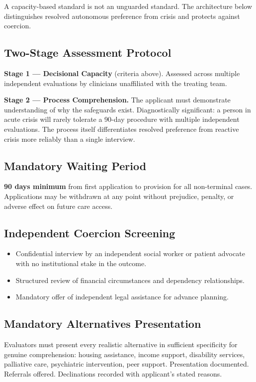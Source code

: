 \documentclass[11pt, letterpaper]{article}
\begin{document}
A capacity-based standard is not an unguarded standard. The architecture below
distinguishes resolved autonomous preference from crisis and protects against coercion.

\subsection{Two-Stage Assessment Protocol}

\textbf{Stage 1 --- Decisional Capacity} (criteria above). Assessed across multiple
independent evaluations by clinicians unaffiliated with the treating team.

\textbf{Stage 2 --- Process Comprehension.} The applicant must demonstrate understanding of
why the safeguards exist. Diagnostically significant: a person in acute crisis will rarely
tolerate a 90-day procedure with multiple independent evaluations. The process itself
differentiates resolved preference from reactive crisis more reliably than a single interview.

\subsection{Mandatory Waiting Period}

\textbf{90 days minimum} from first application to provision for all non-terminal cases.
Applications may be withdrawn at any point without prejudice, penalty, or adverse effect
on future care access.

\subsection{Independent Coercion Screening}

\begin{itemize}
  \item Confidential interview by an independent social worker or patient advocate
    with no institutional stake in the outcome.
  \item Structured review of financial circumstances and dependency relationships.
  \item Mandatory offer of independent legal assistance for advance planning.
\end{itemize}

\subsection{Mandatory Alternatives Presentation}

Evaluators must present every realistic alternative in sufficient specificity for genuine
comprehension: housing assistance, income support, disability services, palliative care,
psychiatric intervention, peer support. Presentation documented. Referrals offered.
Declinations recorded with applicant's stated reasons.
\end{document}
